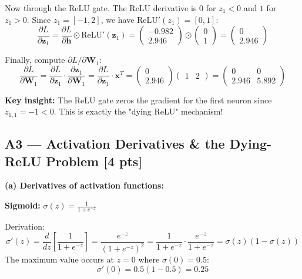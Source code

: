 \documentclass[11pt,a4paper]{article}
\begin{document}
Now through the ReLU gate. The ReLU derivative is $0$ for $z_1 < 0$ and $1$ for $z_1 > 0$. Since $z_1 = [-1, 2]$, we have $\text{ReLU}'(z_1) = [0, 1]$:
\[
\frac{\partial L}{\partial \mathbf{z}_1} = \frac{\partial L}{\partial \mathbf{h}} \odot \text{ReLU}'(\mathbf{z}_1)
= \begin{pmatrix}-0.982\\[2pt] 2.946\end{pmatrix} \odot \begin{pmatrix}0\\[2pt] 1\end{pmatrix}
= \begin{pmatrix}0\\[2pt] 2.946\end{pmatrix}
\]

Finally, compute $\partial L / \partial \mathbf{W}_1$:
\[
\frac{\partial L}{\partial \mathbf{W}_1} = \frac{\partial L}{\partial \mathbf{z}_1} \cdot \frac{\partial \mathbf{z}_1}{\partial \mathbf{W}_1}
= \frac{\partial L}{\partial \mathbf{z}_1} \cdot \mathbf{x}^T
= \begin{pmatrix}0\\[2pt] 2.946\end{pmatrix}\begin{pmatrix}1 & 2\end{pmatrix}
= \begin{pmatrix}0 & 0\\[2pt] 2.946 & 5.892\end{pmatrix}
\]

\textbf{Key insight:} The ReLU gate zeros the gradient for the first neuron since $z_{1,1} = -1 < 0$. This is exactly the "dying ReLU" mechanism!

\subsection*{A3 --- Activation Derivatives \& the Dying-ReLU Problem \hfill [4 pts]}

\textbf{(a) Derivatives of activation functions:}

\textbf{Sigmoid:} $\sigma(z) = \frac{1}{1 + e^{-z}}$

Derivation:
\[
\sigma'(z) = \frac{d}{dz}\left[\frac{1}{1 + e^{-z}}\right]
= \frac{e^{-z}}{(1 + e^{-z})^2}
= \frac{1}{1 + e^{-z}} \cdot \frac{e^{-z}}{1 + e^{-z}}
= \sigma(z)(1 - \sigma(z))
\]
The maximum value occurs at $z = 0$ where $\sigma(0) = 0.5$:
\[
\sigma'(0) = 0.5(1 - 0.5) = 0.25
\]
\end{document}
